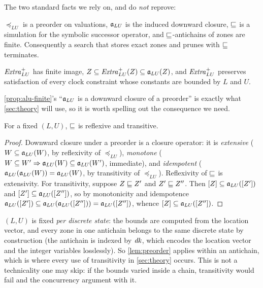 The two standard facts we rely on, and do \emph{not} reprove:

\begin{proposition}\label{prop:alu-finite}
$\preceq_{LU}$ is a preorder on valuations, $\mathfrak{a}_{LU}$ is the induced downward
closure, $\sqsubseteq$ is a simulation for the symbolic successor operator, and
$\sqsubseteq$-antichains of zones are finite.  Consequently a search that stores
exact zones and prunes with $\sqsubseteq$ terminates.
\end{proposition}

\begin{proposition}\label{prop:extra-sound}
$\mathit{Extra}^{+}_{LU}$ has finite image, $Z \subseteq \mathit{Extra}^{+}_{LU}(Z) \subseteq \mathfrak{a}_{LU}(Z)$, and
$\mathit{Extra}^{+}_{LU}$ preserves satisfaction of every clock constraint whose constants are
bounded by $L$ and $U$.
\end{proposition}

\cref{prop:alu-finite}'s ``$\mathfrak{a}_{LU}$ is a downward closure of a preorder'' is
exactly what \cref{sec:theory} will use, so it is worth spelling out the
consequence we need.

\begin{lemma}\label{lem:preorder}
For a fixed $(L,U)$, $\sqsubseteq$ is reflexive and transitive.
\end{lemma}

\begin{proof}
Downward closure under a preorder is a closure operator: it is \emph{extensive}
($W \subseteq \mathfrak{a}_{LU}(W)$, by reflexivity of $\preceq_{LU}$), \emph{monotone}
($W \subseteq W' \Rightarrow \mathfrak{a}_{LU}(W) \subseteq \mathfrak{a}_{LU}(W')$, immediate), and
\emph{idempotent} ($\mathfrak{a}_{LU}(\mathfrak{a}_{LU}(W)) = \mathfrak{a}_{LU}(W)$, by transitivity of
$\preceq_{LU}$).  Reflexivity of $\sqsubseteq$ is extensivity.  For transitivity,
suppose $Z \sqsubseteq Z'$ and $Z' \sqsubseteq Z''$.  Then
$[Z] \subseteq \mathfrak{a}_{LU}([Z'])$ and $[Z'] \subseteq \mathfrak{a}_{LU}([Z''])$, so by monotonicity
and idempotence
$\mathfrak{a}_{LU}([Z']) \subseteq \mathfrak{a}_{LU}(\mathfrak{a}_{LU}([Z''])) = \mathfrak{a}_{LU}([Z''])$, whence
$[Z] \subseteq \mathfrak{a}_{LU}([Z''])$.
\end{proof}

\begin{remark}
$(L,U)$ is fixed \emph{per discrete state}: the bounds are computed from the
location vector, and every zone in one antichain belongs to the same discrete
state by construction (the antichain is indexed by $\mathit{dk}$, which encodes the
location vector and the integer variables losslessly).  So \cref{lem:preorder}
applies within an antichain, which is where every use of transitivity in
\cref{sec:theory} occurs.  This is not a technicality one may skip: if the
bounds varied inside a chain, transitivity would fail and the concurrency
argument with it.
\end{remark}

